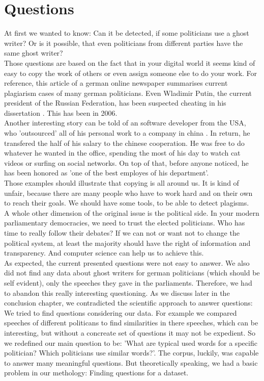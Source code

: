 \documentclass[12pt,paper=a4,nenglish]{scrreprt}
\begin{document}
\section{Questions}
At first we wanted to know: Can it be detected, if some politicians
use a ghost writer? Or is it possible, that even politicians from different
parties have the same ghost writer? \\ 
Those questions are based on the fact that in your digital world it
seems kind of easy to copy the work of others or even assign someone else to do
your work. For reference, this article \cite{plagiat_1} of a german online newspaper 
summarises current plagiarism cases of many german politicians. 
Even Wladimir Putin, the current president of the Russian Federation, has been
suspected cheating in his dissertation \cite{plagiat_2}. This has been in
2006. \\
Another interesting story can be told of an software developer from the USA,
who 'outsourced' all of his personal work to a company in china
\cite{plagiat_3}. In return, he transfered the half of his salary to the chinese
cooperation. He was free to do whatever he wanted in the office, spending the
most of his day to watch cat videos or surfing on social networks. 
On top of that, before anyone noticed, he has been honored as 'one of the best
employes of his department'. \\
Those examples should illustrate that copying is all around us. 
It is kind of unfair, because there are many people who have to work hard and on
their own to reach their goals. We should have some tools, to be able to detect plagisms.\\
A whole other dimension of the original issue is the political side. In your
modern parliamentary democracies, we need to trust the elected
politicians. Who has time to really follow their debates? If we can not or
want not to change the political system, at least the majority should have the
right of information and transparency. And computer science can help us to achieve this.
\\
As expected, the current presented questions were not easy to
answer. We also did not find any data about ghost writers for german
politicians (which should be self evident), only the speeches they gave in the
parliaments.
Therefore, we had to abandon this really interesting questioning. As
we discuss later in the conclusion chapter, we contradicted the scientific
approach to answer questions: We tried to find questions considering our data. 
For example we compared speeches of different politicans to find similarities
in there speeches, which can be interesting, but without a concreate set of
questions it may not be expedient.  
So we redefined our main question to be: 'What are typical used words for a
specific politician? Which politicians use similar words?'. 
The corpus, luckily, was capable to answer many meaningful questions. But
theoretically speaking, we had a basic problem in our methology: Finding questions for a
dataset. 
\end{document}
